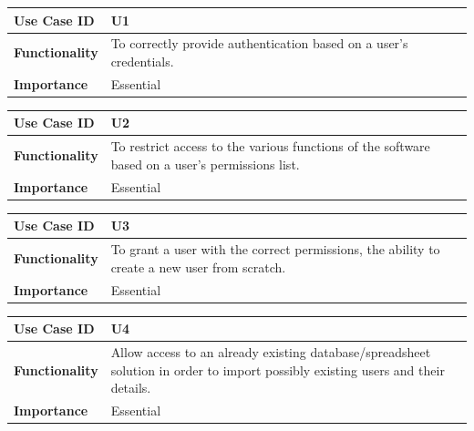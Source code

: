 \documentclass[a4paper,12pt]{article}
\begin{document}
        	\begin{center}
        		\begin{tabularx}{\textwidth}{ |X|X| }
        			
        			\hline
        			\textbf{Use Case ID} & U1 \\
        			\hline
        			\textbf{Functionality} & To correctly provide authentication based on a user's credentials. \\
        			\hline
        			\textbf{Importance} & Essential \\
        			\hline
        			
        		\end{tabularx}
        	\end{center}
        	
        	\begin{center}
        		\begin{tabularx}{\textwidth}{ |X|X| }
        			
        			\hline
        			\textbf{Use Case ID} & U2 \\
        			\hline
        			\textbf{Functionality} & To restrict access to the various functions of the software based on a user's permissions list. \\
        			\hline
        			\textbf{Importance} & Essential \\
        			\hline
        			
        		\end{tabularx}
        	\end{center}
        	
        	\begin{center}
        		\begin{tabularx}{\textwidth}{ |X|X| }
        			
        			\hline
        			\textbf{Use Case ID} & U3 \\
        			\hline
        			\textbf{Functionality} & To grant a user with the correct permissions, the ability to create a new user from scratch. \\
        			\hline
        			\textbf{Importance} & Essential \\
        			\hline
        			
        		\end{tabularx}
        	\end{center}
        	
        	\begin{center}
        		\begin{tabularx}{\textwidth}{ |X|X| }
        			
        			\hline
        			\textbf{Use Case ID} & U4 \\
        			\hline
        			\textbf{Functionality} & Allow access to an already existing database/spreadsheet solution in order to import possibly existing users and their details. \\
        			\hline
        			\textbf{Importance} & Essential \\
        			\hline
        			
        		\end{tabularx}
        	\end{center}
        	
\end{document}
